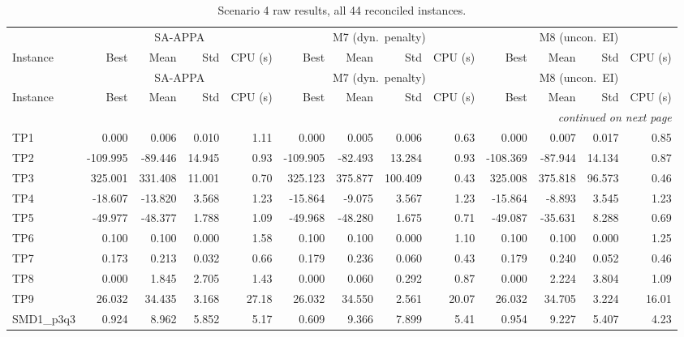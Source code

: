 \begingroup\scriptsize
\begin{longtable}{lrrrrrrrrrrrr}
\caption{Scenario 4 raw results, all 44 reconciled instances.}\label{tab:scenario4}\\
\toprule
 & \multicolumn{4}{c}{SA-APPA} & \multicolumn{4}{c}{M7 (dyn.\ penalty)} & \multicolumn{4}{c}{M8 (uncon.\ EI)} \\
\cmidrule(lr){2-5} \cmidrule(lr){6-9} \cmidrule(lr){10-13}
Instance & Best & Mean & Std & CPU (s) & Best & Mean & Std & CPU (s) & Best & Mean & Std & CPU (s) \\
\midrule
\endfirsthead
\toprule
 & \multicolumn{4}{c}{SA-APPA} & \multicolumn{4}{c}{M7 (dyn.\ penalty)} & \multicolumn{4}{c}{M8 (uncon.\ EI)} \\
\cmidrule(lr){2-5} \cmidrule(lr){6-9} \cmidrule(lr){10-13}
Instance & Best & Mean & Std & CPU (s) & Best & Mean & Std & CPU (s) & Best & Mean & Std & CPU (s) \\
\midrule
\endhead
\midrule\multicolumn{13}{r}{\emph{continued on next page}}\\\midrule
\endfoot
\bottomrule
\endlastfoot
TP1 & 0.000 & 0.006 & 0.010 & 1.11 & 0.000 & 0.005 & 0.006 & 0.63 & 0.000 & 0.007 & 0.017 & 0.85 \\
TP2 & -109.995 & -89.446 & 14.945 & 0.93 & -109.905 & -82.493 & 13.284 & 0.93 & -108.369 & -87.944 & 14.134 & 0.87 \\
TP3 & 325.001 & 331.408 & 11.001 & 0.70 & 325.123 & 375.877 & 100.409 & 0.43 & 325.008 & 375.818 & 96.573 & 0.46 \\
TP4 & -18.607 & -13.820 & 3.568 & 1.23 & -15.864 & -9.075 & 3.567 & 1.23 & -15.864 & -8.893 & 3.545 & 1.23 \\
TP5 & -49.977 & -48.377 & 1.788 & 1.09 & -49.968 & -48.280 & 1.675 & 0.71 & -49.087 & -35.631 & 8.288 & 0.69 \\
TP6 & 0.100 & 0.100 & 0.000 & 1.58 & 0.100 & 0.100 & 0.000 & 1.10 & 0.100 & 0.100 & 0.000 & 1.25 \\
TP7 & 0.173 & 0.213 & 0.032 & 0.66 & 0.179 & 0.236 & 0.060 & 0.43 & 0.179 & 0.240 & 0.052 & 0.46 \\
TP8 & 0.000 & 1.845 & 2.705 & 1.43 & 0.000 & 0.060 & 0.292 & 0.87 & 0.000 & 2.224 & 3.804 & 1.09 \\
TP9 & 26.032 & 34.435 & 3.168 & 27.18 & 26.032 & 34.550 & 2.561 & 20.07 & 26.032 & 34.705 & 3.224 & 16.01 \\
SMD1\_p3q3 & 0.924 & 8.962 & 5.852 & 5.17 & 0.609 & 9.366 & 7.899 & 5.41 & 0.954 & 9.227 & 5.407 & 4.23 \\

\end{longtable}
